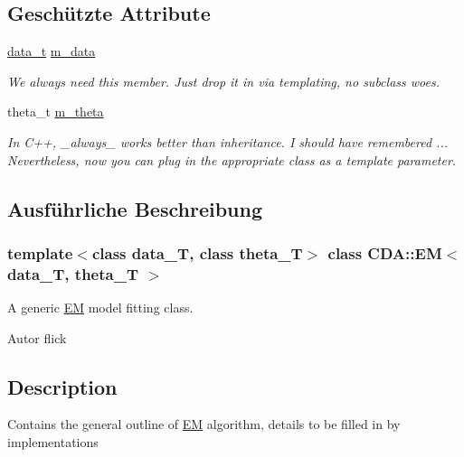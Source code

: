 \subsection*{Geschützte Attribute}
\begin{DoxyCompactItemize}
\item 
\hypertarget{classCDA_1_1EM_a261037c3e786c1615ea23562a23f3cce}{
\hyperlink{classCDA_1_1EM_a3f4735ec5ea6c523ebc4c9f2b51be762}{data\_\-t} \hyperlink{classCDA_1_1EM_a261037c3e786c1615ea23562a23f3cce}{m\_\-data}}
\label{classCDA_1_1EM_a261037c3e786c1615ea23562a23f3cce}

\begin{DoxyCompactList}\small\item\em We always need this member. Just drop it in via templating, no subclass woes. \item\end{DoxyCompactList}\item 
\hypertarget{classCDA_1_1EM_a64fa0e44a0204dee110cf1095f69ab5c}{
theta\_\-t \hyperlink{classCDA_1_1EM_a64fa0e44a0204dee110cf1095f69ab5c}{m\_\-theta}}
\label{classCDA_1_1EM_a64fa0e44a0204dee110cf1095f69ab5c}

\begin{DoxyCompactList}\small\item\em In C++, \_\-always\_\- works better than inheritance. I should have remembered ... Nevertheless, now you can plug in the appropriate class as a template parameter. \item\end{DoxyCompactList}\end{DoxyCompactItemize}


\subsection{Ausführliche Beschreibung}
\subsubsection*{template$<$class data\_\-T, class theta\_\-T$>$ class CDA::EM$<$ data\_\-T, theta\_\-T $>$}

A generic \hyperlink{classCDA_1_1EM}{EM} model fitting class. \begin{DoxyAuthor}{Autor}
flick
\end{DoxyAuthor}
\hypertarget{GaussianMixtureModel_8h_09_09_Description}{}\subsection{Description}\label{GaussianMixtureModel_8h_09_09_Description}
Contains the general outline of \hyperlink{classCDA_1_1EM}{EM} algorithm, details to be filled in by implementations


